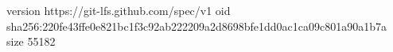 version https://git-lfs.github.com/spec/v1
oid sha256:220fe43ffe0e821bc1f3c92ab222209a2d8698bfe1dd0ac1ca09c801a90a1b7a
size 55182
